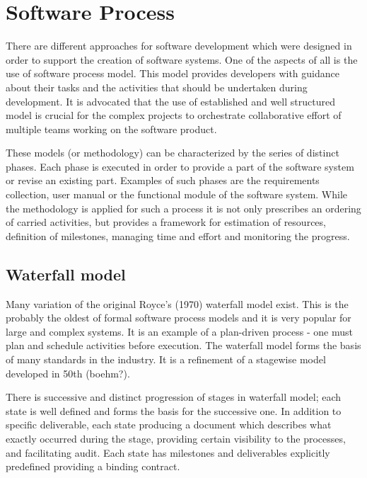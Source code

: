 \chapter{Software Process}
There are different approaches for software development which were designed in order to 
support the creation of software systems. One of the aspects of all is the use of 
software process model. This model provides developers with guidance about their tasks 
and the activities that should be undertaken during development. It is advocated that the 
use of established and well structured model is crucial for the complex projects to 
orchestrate collaborative effort of multiple teams working on the software product. 

These models (or methodology) can be characterized by the series of distinct phases. 
Each phase is executed in order to provide a part of the software system or revise 
an existing part. Examples of such phases are the requirements collection, user manual 
or the functional module of the software system. While the methodology is applied for 
such a process it is not only prescribes an ordering of carried activities, but 
provides a framework for estimation of resources, definition of milestones, managing 
time and effort and monitoring the progress. 

\section{Waterfall model}
Many variation of the original Royce's (1970) waterfall model exist.  
This is the probably the oldest of formal software process models and it is very popular 
for large and complex systems. It is an example of a plan-driven process - one must 
plan and schedule activities before execution. The waterfall 
model forms the basis of many standards in the industry. It is a refinement of a 
stagewise model developed in 50th (boehm?).

There is successive and distinct progression of stages in waterfall model; each state 
is well defined and forms the basis for the successive one. In addition to specific 
deliverable, each state producing a document which describes what exactly occurred 
during the stage, providing certain visibility to the processes, and facilitating 
audit. Each state has milestones and deliverables explicitly predefined providing 
a binding contract. 


